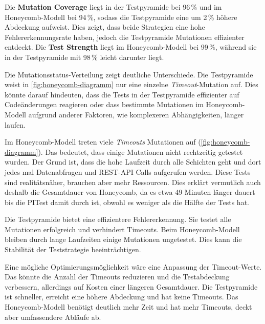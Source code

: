 Die \textbf{Mutation Coverage} liegt in der Testpyramide bei 96\,\% und im Honeycomb-Modell bei 94\,\%, sodass die Testpyramide eine um 2\,\% höhere Abdeckung aufweist. Dies zeigt, dass beide Strategien eine hohe Fehlererkennungsrate haben, jedoch die Testpyramide Mutationen effizienter entdeckt. Die \textbf{Test Strength} liegt im Honeycomb-Modell bei 99\,\%, während sie in der Testpyramide mit 98\,\% leicht darunter liegt.

Die Mutationsstatus-Verteilung zeigt deutliche Unterschiede. Die Testpyramide weist in \autoref{fig:honeycomb-diagramm} nur eine einzelne \textit{Timeout}-Mutation auf. Dies könnte darauf hindeuten, dass die Tests in der Testpyramide effizienter auf Codeänderungen reagieren oder dass bestimmte Mutationen im Honeycomb-Modell aufgrund anderer Faktoren, wie komplexeren Abhängigkeiten, länger laufen.

Im Honeycomb-Modell treten viele \textit{Timeouts} Mutationen auf (\autoref{fig:honeycomb-diagramm}). Das bedeutet, dass einige Mutationen nicht rechtzeitig getestet wurden. Der Grund ist, dass die hohe Laufzeit durch alle Schichten geht und dort jedes mal Datenabfragen und REST-API Calls aufgerufen werden. Diese Tests sind realitätsnäher, brauchen aber mehr Ressourcen. Dies erklärt vermutlich auch deshalb die Gesamtdauer von Honeycomb, da es etwa 49 Minuten länger dauert bis die PITest damit durch ist, obwohl es weniger als die Hälfte der Tests hat.

Die Testpyramide bietet eine effizientere Fehlererkennung. Sie testet alle Mutationen erfolgreich und verhindert Timeouts. Beim Honeycomb-Modell bleiben durch lange Laufzeiten einige Mutationen ungetestet. Dies kann die Stabilität der Teststrategie beeinträchtigen.

Eine mögliche Optimierungsmöglichkeit wäre eine Anpassung der Timeout-Werte. Das könnte die Anzahl der Timeouts reduzieren und die Testabdeckung verbessern, allerdings auf Kosten einer längeren Gesamtdauer. Die Testpyramide ist schneller, erreicht eine höhere Abdeckung und hat keine Timeouts. Das Honeycomb-Modell benötigt deutlich mehr Zeit und hat mehr Timeouts, deckt aber umfassendere Abläufe ab.
